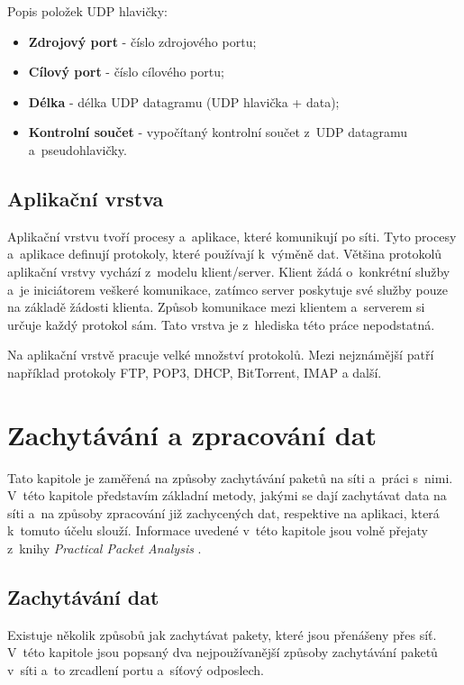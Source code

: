 Popis položek UDP hlavičky:

\begin{itemize}
    \item \textbf{Zdrojový port} - číslo zdrojového portu;
    \item \textbf{Cílový port} - číslo cílového portu;
    \item \textbf{Délka} - délka UDP datagramu (UDP hlavička + data);
    \item \textbf{Kontrolní součet} - vypočítaný kontrolní součet z~UDP datagramu a~pseudohlavičky. 
\end{itemize}

\section{Aplikační vrstva}
Aplikační vrstvu tvoří procesy a~aplikace, které komunikují po síti. Tyto procesy a~aplikace definují protokoly, které používají k~výměně dat. Většina protokolů aplikační vrstvy vychází z~modelu klient/server. Klient žádá o~konkrétní služby a~je iniciátorem veškeré komunikace, zatímco server poskytuje své služby pouze na základě žádosti klienta. Způsob komunikace mezi klientem a~serverem si určuje každý protokol sám. Tato vrstva je z~hlediska této práce nepodstatná. 

Na aplikační vrstvě pracuje velké množství protokolů. Mezi nejznámější patří například protokoly FTP, POP3, DHCP, BitTorrent, IMAP a další. 

\chapter{Zachytávání a zpracování dat}
\label{chap:zachyt}
Tato kapitole je zaměřená na způsoby zachytávání paketů na síti a~práci s~nimi. V~této kapitole představím základní metody, jakými se dají zachytávat data na síti a~na způsoby zpracování již zachycených dat, respektive na aplikaci, která k~tomuto účelu slouží. Informace uvedené v~této kapitole jsou volně přejaty z~knihy \emph{Practical Packet Analysis} \cite{analyza}.

\section{Zachytávání dat}
Existuje několik způsobů jak zachytávat pakety, které jsou přenášeny přes síť. V~této kapitole jsou popsaný dva nejpoužívanější způsoby zachytávání paketů v~síti a~to zrcadlení portu a~síťový odposlech. 

